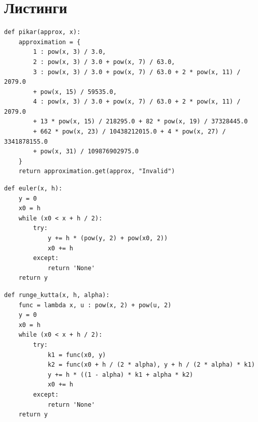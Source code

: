 \documentclass[14pt, a4paper]{extarticle}
\begin{document}
\section*{Листинги}
\begin{lstlisting}[caption=Метод Пикара]
def pikar(approx, x):
	approximation = {
		1 : pow(x, 3) / 3.0,
		2 : pow(x, 3) / 3.0 + pow(x, 7) / 63.0,
		3 : pow(x, 3) / 3.0 + pow(x, 7) / 63.0 + 2 * pow(x, 11) / 2079.0
		+ pow(x, 15) / 59535.0,
		4 : pow(x, 3) / 3.0 + pow(x, 7) / 63.0 + 2 * pow(x, 11) / 2079.0
		+ 13 * pow(x, 15) / 218295.0 + 82 * pow(x, 19) / 37328445.0
		+ 662 * pow(x, 23) / 10438212015.0 + 4 * pow(x, 27) / 3341878155.0
		+ pow(x, 31) / 109876902975.0
	}
	return approximation.get(approx, "Invalid")
\end{lstlisting}
	
\begin{lstlisting}[caption=Метод Эйлера]
def euler(x, h):
	y = 0
	x0 = h
	while (x0 < x + h / 2):
		try:
			y += h * (pow(y, 2) + pow(x0, 2))
			x0 += h
		except:
			return 'None' 
	return y
\end{lstlisting}

\begin{lstlisting}[caption=Рунге-Кутта]
def runge_kutta(x, h, alpha):
	func = lambda x, u : pow(x, 2) + pow(u, 2)
	y = 0
	x0 = h
	while (x0 < x + h / 2):
		try:
			k1 = func(x0, y)
			k2 = func(x0 + h / (2 * alpha), y + h / (2 * alpha) * k1)
			y += h * ((1 - alpha) * k1 + alpha * k2)
			x0 += h
		except:
			return 'None'
	return y
\end{lstlisting}
\end{document}
